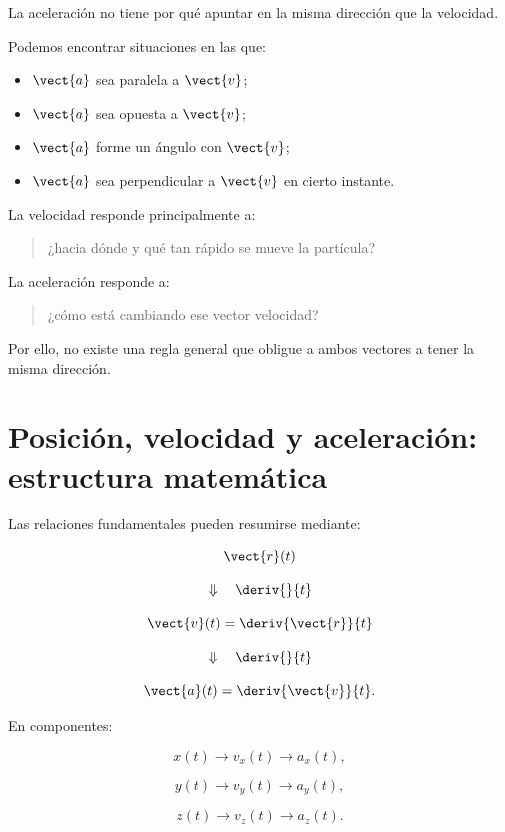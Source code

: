 La aceleración no tiene por qué apuntar en la misma dirección que la velocidad.

Podemos encontrar situaciones en las que:

\begin{itemize}
    \item \(\vect{a}\) sea paralela a \(\vect{v}\);
    \item \(\vect{a}\) sea opuesta a \(\vect{v}\);
    \item \(\vect{a}\) forme un ángulo con \(\vect{v}\);
    \item \(\vect{a}\) sea perpendicular a \(\vect{v}\) en cierto instante.
\end{itemize}

\begin{interpretacion}
La velocidad responde principalmente a:

\begin{quote}
¿hacia dónde y qué tan rápido se mueve la partícula?
\end{quote}

La aceleración responde a:

\begin{quote}
¿cómo está cambiando ese vector velocidad?
\end{quote}

Por ello, no existe una regla general que obligue a ambos vectores a tener la
misma dirección.
\end{interpretacion}


\section{Posición, velocidad y aceleración: estructura matemática}

Las relaciones fundamentales pueden resumirse mediante:

\[
\vect{r}(t)
\]

\[
\Downarrow\quad
\deriv{}{t}
\]

\[
\vect{v}(t)
=
\deriv{\vect{r}}{t}
\]

\[
\Downarrow\quad
\deriv{}{t}
\]

\[
\vect{a}(t)
=
\deriv{\vect{v}}{t}.
\]

En componentes:

\[
x(t)
\longrightarrow
v_x(t)
\longrightarrow
a_x(t),
\]

\[
y(t)
\longrightarrow
v_y(t)
\longrightarrow
a_y(t),
\]

\[
z(t)
\longrightarrow
v_z(t)
\longrightarrow
a_z(t).
\]


